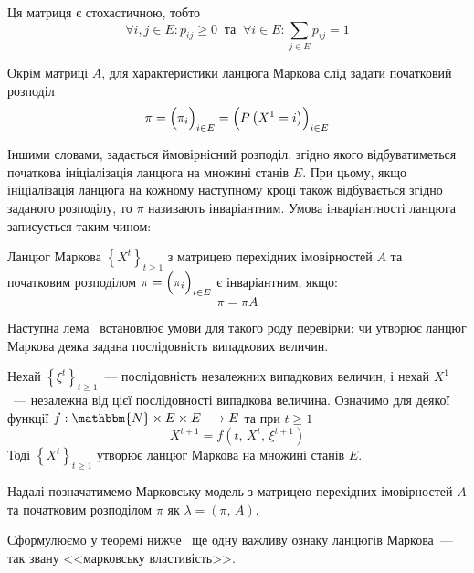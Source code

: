 Ця матриця є стохастичною, тобто
\begin{equation*}
    \forall i,j \in E: p_{ij} \geqslant 0\ \text{ та }\ \forall i \in E: \sum\limits_{j \in E} p_{ij} = 1
\end{equation*}

Окрім матриці $A$, для характеристики ланцюга Маркова слід задати початковий розподіл
\begin{equation*}
    \pi = \Bigl( \pi_i \Bigr)_{i \in E} = \Bigl( P\left( X^{1} = i \right) \Bigr)_{i \in E}
\end{equation*}

Іншими словами, задається ймовірнісний розподіл, згідно якого відбуватиметься початкова ініціалізація ланцюга на множині станів $E$. При цьому, якщо ініціалізація ланцюга на кожному наступному кроці також відбувається згідно заданого розподілу, то $\pi$ називають інваріантним. Умова інваріантності ланцюга записується таким чином:

\begin{definition}
    Ланцюг Маркова $\left\{ X^t \right\}_{t\geqslant 1}$ з матрицею перехідних імовірностей $A$ та початковим розподілом $\pi = \Bigl( \pi_i \Bigr)_{i \in E}$ є інваріантним, якщо:
    \begin{equation*}
        \pi = \pi A
    \end{equation*}
\end{definition}

Наступна лема~\cite{Serfozo2009} встановлює умови для такого роду перевірки: чи утворює ланцюг Маркова деяка задана послідовність випадкових величин.

\begin{lemma}
    Нехай $\left\{ \xi^t \right\}_{t\geqslant 1}$~--- послідовність незалежних випадкових величин, і нехай $X^1$~--- незалежна від цієї послідовності випадкова величина. Означимо для деякої функції $f:\mathbbm{N}\times E\times E \longrightarrow E$ та при $t \geqslant 1$
    \begin{equation*}
        X^{t+1} = f(t,\,X^t,\,\xi^{t+1})
    \end{equation*}
    Тоді $\left\{ X^t \right\}_{t\geqslant 1}$ утворює ланцюг Маркова на множині станів $E$.
\end{lemma}

Надалі позначатимемо Марковську модель з матрицею перехідних імовірностей $A$ та початковим розподілом $\pi$ як $\lambda=(\pi,\,A)$.

Сформулюємо у теоремі нижче~\cite{Norris1997} ще одну важливу ознаку ланцюгів Маркова~--- так звану <<марковську властивість>>.

